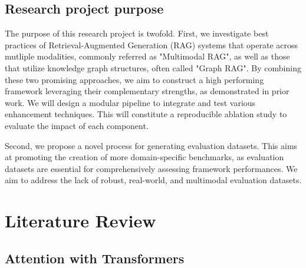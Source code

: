 \documentclass[12pt,twoside]{report}
\begin{document}
\section{Research project purpose}
The purpose of this research project is twofold. First, we investigate best practices of Retrieval-Augmented Generation (RAG) systems that operate across mutliple modalities, commonly referred as "Multimodal RAG", as well as those that utilize knowledge graph structures, often called "Graph RAG". By combining these two promising approaches, we aim to construct a high performing framework leveraging their complementary strengths, as demonstrated in prior work\cite{HMRAG}. We will design a modular pipeline to integrate and test various enhancement techniques. This will constitute a reproducible ablation study to evaluate the impact of each component.

Second, we propose a novel process for generating evaluation datasets. This aims at promoting the creation of more domain-specific benchmarks, as evaluation datasets are essential for comprehensively assessing framework performances. We aim to address the lack of robust, real-world, and multimodal evaluation datasets.


\chapter{Literature Review}

\section{Attention with Transformers}
\end{document}

